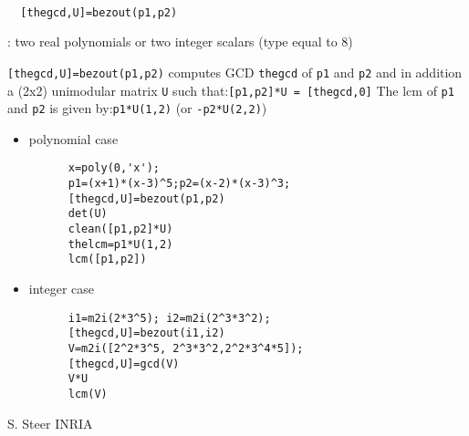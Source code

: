 \begin{mandesc}
   \\ %
\end{mandesc}
\begin{calling_sequence}
\begin{verbatim}
  [thegcd,U]=bezout(p1,p2)   
\end{verbatim}
\end{calling_sequence}
\begin{parameters}
  \begin{varlist}
    : two real polynomials or two integer scalars (type equal to 8)
  \end{varlist}
\end{parameters}
\begin{mandescription}
  \verb![thegcd,U]=bezout(p1,p2)! computes GCD \verb!thegcd! of \verb!p1! and \verb!p2! and in addition a (2x2) 
  unimodular matrix \verb!U! such that:\verb![p1,p2]*U = [thegcd,0]!
  The lcm of \verb!p1! and \verb!p2! is given by:\verb!p1*U(1,2)! (or \verb!-p2*U(2,2)!)
\end{mandescription}
\begin{examples}
  \begin{itemize}
  \item polynomial case 
    \begin{Verbatim}
      x=poly(0,'x');
      p1=(x+1)*(x-3)^5;p2=(x-2)*(x-3)^3;
      [thegcd,U]=bezout(p1,p2) 
      det(U)
      clean([p1,p2]*U)
      thelcm=p1*U(1,2)
      lcm([p1,p2])
    \end{Verbatim}
  \item integer case 
    \begin{Verbatim}
      i1=m2i(2*3^5); i2=m2i(2^3*3^2);
      [thegcd,U]=bezout(i1,i2) 
      V=m2i([2^2*3^5, 2^3*3^2,2^2*3^4*5]);
      [thegcd,U]=gcd(V)
      V*U
      lcm(V)
    \end{Verbatim}
  \end{itemize}
\end{examples}
\begin{manseealso}
        
\end{manseealso}
\begin{authors}
  S. Steer INRIA
\end{authors}
